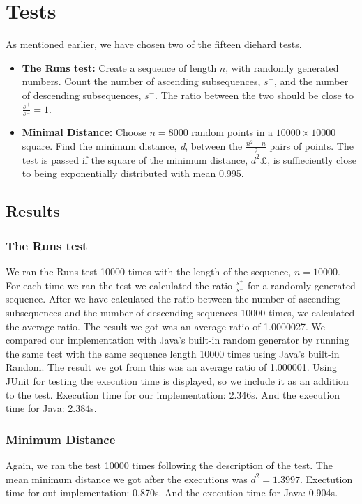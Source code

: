 \section{Tests}
As mentioned earlier, we have chosen two of the fifteen diehard tests. 
\begin{itemize}
\item \textbf{The Runs test: }Create a sequence of length $n$, with randomly generated numbers. Count the number of ascending subsequences, $s^+$, and the number of descending subsequences, $s^-$. The ratio between the two should be close to $\frac{s^+}{s^-} = 1$.

\item \textbf{Minimal Distance: }Choose $n = 8000$ random points in a $10000 \times 10000$ square. Find the minimum distance, \textit{d}, between the $\frac{n^2 -n}{2}$ pairs of points. The test is passed if the square of the minimum distance, $d^2£$, is suffieciently close to being exponentially distributed with mean 0.995. 
\end{itemize}

\subsection{Results}
\subsubsection{The Runs test}
We ran the Runs test 10000 times with the length of the sequence, $n = 10000$. For each time we ran the test we calculated the ratio $\frac{s^+}{s^-}$ for a randomly generated sequence. After we have calculated the ratio between the number of ascending subsequences and the number of descending sequences 10000 times, we calculated the average ratio. The result we got was an average ratio of 1.0000027. We compared our implementation with Java's built-in random generator by running the same test with the same sequence length 10000 times using Java's built-in Random. The result we got from this was an average ratio of 1.000001. Using JUnit for testing the execution time is displayed, so we include it as an addition to the test. Execution time for our implementation: 2.346s. And the execution time for Java: 2.384s.

\subsubsection{Minimum Distance}
Again, we ran the test 10000 times following the description of the test\cite{jdiehard}. The mean minimum distance we got after the executions was $d^2 = 1.3997$. Exectution time for out implementation: 0.870s. And the execution time for Java: 0.904s.

